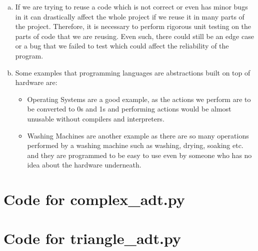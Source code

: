 \documentclass[12pt]{article}
\begin{document}
\begin{enumerate}[(a)]
\item If we are trying to reuse a code which is not correct or even has minor bugs in it can drastically affect the whole project if we reuse it in many parts of the project. Therefore, it is necessary to perform rigorous unit testing on the parts of code that we are reusing. Even such, there could still be an edge case or a bug that we failed to test which could affect the reliability of the program.

\item Some examples that programming languages are abstractions built on top of hardware are:

\begin{itemize}
    
\item Operating Systems are a good example, as the actions we perform are to be converted to 0s and 1s and performing actions would be almost unusable without compilers and interpreters. 

\item Washing Machines are another example as there are so many operations performed by a washing machine such as washing, drying, soaking etc. and they are programmed to be easy to use even by someone who has no idea about the hardware underneath.
    
\end{itemize}


\end{enumerate}

\newpage

\lstset{language=Python, basicstyle=\tiny, breaklines=true, showspaces=false,
  showstringspaces=false, breakatwhitespace=true}

\def\thesection{\Alph{section}}

\section{Code for complex\_adt.py}

\noindent 

\newpage

\section{Code for triangle\_adt.py}

\noindent 
\end{document}
